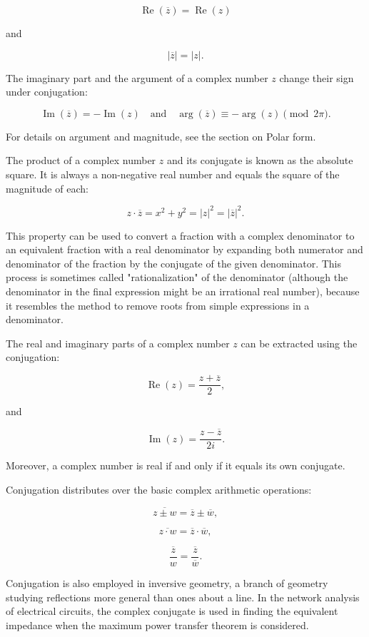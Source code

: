 $$\operatorname{Re}(\overline{z}) = \operatorname{Re}(z)$$

and

$$|\overline{z}| = |z|.$$

The imaginary part and the argument of a complex number $z$ change their sign under conjugation:

$$\operatorname{Im}(\overline{z}) = -\operatorname{Im}(z) \quad \text{and} \quad \operatorname{arg}(\overline{z}) \equiv -\operatorname{arg}(z) \pmod{2\pi}.$$

For details on argument and magnitude, see the section on Polar form.

The product of a complex number $z$ and its conjugate is known as the absolute square. It is always a non-negative real number and equals the square of the magnitude of each:

$$z \cdot \overline{z} = x^2 + y^2 = |z|^2 = |\overline{z}|^2.$$

This property can be used to convert a fraction with a complex denominator to an equivalent fraction with a real denominator by expanding both numerator and denominator of the fraction by the conjugate of the given denominator. This process is sometimes called "rationalization" of the denominator (although the denominator in the final expression might be an irrational real number), because it resembles the method to remove roots from simple expressions in a denominator.

The real and imaginary parts of a complex number $z$ can be extracted using the conjugation:

$$\operatorname{Re}(z) = \frac{z + \overline{z}}{2},$$

and

$$\operatorname{Im}(z) = \frac{z - \overline{z}}{2i}.$$

Moreover, a complex number is real if and only if it equals its own conjugate.

Conjugation distributes over the basic complex arithmetic operations:

$$\overline{z \pm w} = \overline{z} \pm \overline{w},$$

$$\overline{z \cdot w} = \overline{z} \cdot \overline{w},$$

$$\overline{\frac{z}{w}} = \frac{\overline{z}}{\overline{w}}.$$

Conjugation is also employed in inversive geometry, a branch of geometry studying reflections more general than ones about a line. In the network analysis of electrical circuits, the complex conjugate is used in finding the equivalent impedance when the maximum power transfer theorem is considered.

